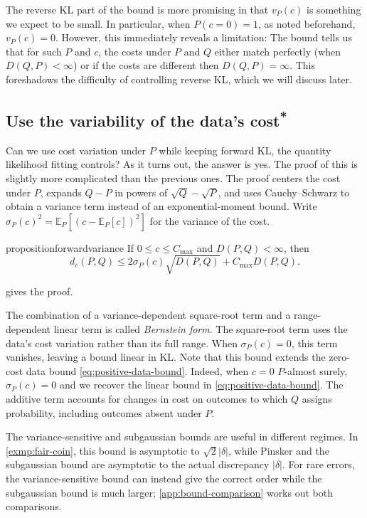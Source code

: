 \documentclass[11pt,twoside]{article}
\newcommand{\E}{\mathbb E}
\newcommand{\KL}{D}
\newcommand{\suppmark}{\texorpdfstring{\textsuperscript{*}}{*}}
\theoremstyle{definition}
\theoremstyle{remark}
\begin{document}
The reverse KL part of the bound
is more promising in that $v_P(c)$ is
something we expect to be small.
In particular, when $P(c=0)=1$, as noted beforehand,
$v_P(c)=0$. However, this immediately reveals a limitation:
The bound tells us that for such $P$ and $c$,
the costs under $P$ and $Q$ either
match perfectly (when $\KL(Q, P)<\infty$)
or if the costs are different then $\KL(Q, P)=\infty$.
This foreshadows the difficulty of controlling reverse KL,
which we will discuss later.

\subsection{Use the variability of the data's cost\suppmark}
\label{sec:variance-comparison}

Can we use cost variation under \(P\) while keeping forward KL,
the quantity likelihood fitting controls?
As it turns out, the answer is yes. The proof of this is slightly more complicated
than the previous ones.
The proof centers the cost under \(P\), expands \(Q-P\) in powers of
\(\sqrt Q-\sqrt P\), and uses Cauchy--Schwarz to obtain a variance
term instead of an exponential-moment bound.
Write \(\sigma_P(c)^2=\E_P[(c-\E_P[c])^2]\) for the variance of the cost.

\begin{restatable}{proposition}{forwardvariance}
\label{prop:forward-variance}
If \(0\le c\le C_{\max}\) and \(\KL(P, Q)<\infty\), then
\begin{equation}
 d_c(P,Q)\le2\sigma_P(c)\sqrt{\KL(P, Q)}
             +C_{\max}\KL(P, Q).
 \label{eq:forward-variance}
\end{equation}
\end{restatable}
 gives the proof.

The combination of a variance-dependent square-root term and a
range-dependent linear term is called \emph{Bernstein form}.
The square-root term uses the data's cost variation rather than its
full range.
When \(\sigma_P(c)=0\), this term vanishes, leaving a bound
linear in KL.
Note that this bound extends
the zero-cost data bound \cref{eq:positive-data-bound}.
Indeed, when $c=0$ $P$-almost surely,
$\sigma_P(c)=0$ and we recover the linear bound in
\cref{eq:positive-data-bound}.
The additive term accounts for changes in cost on outcomes
to which \(Q\) assigns probability, including outcomes absent under \(P\).

The variance-sensitive and subgaussian bounds are useful in different
regimes. In \cref{exmp:fair-coin}, this bound is asymptotic to
\(\sqrt2|\delta|\), while Pinsker and the subgaussian bound are
asymptotic to the actual discrepancy \(|\delta|\).
For rare errors, the variance-sensitive bound can instead give the
correct order while the subgaussian bound is much larger;
\cref{app:bound-comparison} works out both comparisons.
\end{document}
